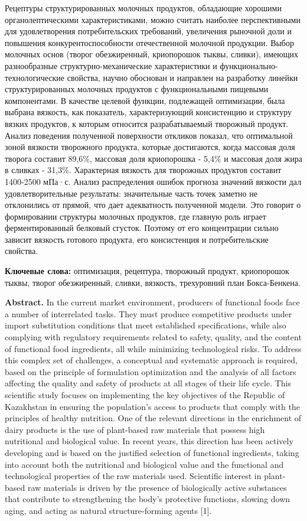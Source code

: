 Рецептуры структурированных молочных продуктов, обладающие хорошими
органолептическими характеристиками, можно считать наиболее
перспективными для удовлетворения потребительских требований, увеличения
рыночной доли и повышения конкурентоспособности отечественной молочной
продукции. Выбор молочных основ (творог обезжиренный, криопорошок тыквы,
сливки), имеющих разнообразные структурно-механические характеристики и
функционально-технологические свойства, научно обоснован и направлен на
разработку линейки структурированных молочных продуктов с
функциональными пищевыми компонентами. В качестве целевой функции,
подлежащей оптимизации, была выбрана вязкость, как показатель,
характеризующий консистенцию и структуру вязких продуктов, к которым
относится разрабатываемый творожный продукт. Анализ поведения полученной
поверхности откликов показал, что оптимальной зоной вязкости творожного
продукта, которые достигаются, когда массовая доля творога составит
89,6\%, массовая доля криопорошка - 5,4\% и массовая доля жира в сливках
- 31,3\%. Характерная вязкость для творожных продуктов составит
1400-2500 мПа·с. Анализ распределения ошибок прогноза значений вязкости
дал удовлетворительные результаты: значительные часть точек заметно не
отклонились от прямой, что дает адекватность полученной модели. Это
говорит о формировании структуры молочных продуктов, где главную роль
играет ферментированный белковый сгусток. Поэтому от его концентрации
сильно зависит вязкость готового продукта, его консистенция и
потребительские свойства.

{\bfseries Ключевые слова:} оптимизация, рецептура, творожный продукт,
криопорошок тыквы, творог обезжиренный, сливки, вязкость, трехуровний
план Бокса-Бенкена.

{\bfseries Abstract.} In the current market environment, producers of
functional foods face a number of interrelated tasks. They must produce
competitive products under import substitution conditions that meet
established specifications, while also complying with regulatory
requirements related to safety, quality, and the content of functional
food ingredients, all while minimizing technological risks. To address
this complex set of challenges, a conceptual and systematic approach is
required, based on the principle of formulation optimization and the
analysis of all factors affecting the quality and safety of products at
all stages of their life cycle. This scientific study focuses on
implementing the key objectives of the Republic of Kazakhstan in
ensuring the population's access to products that comply with the
principles of healthy nutrition. One of the relevant directions in the
enrichment of dairy products is the use of plant-based raw materials
that possess high nutritional and biological value. In recent years,
this direction has been actively developing and is based on the
justified selection of functional ingredients, taking into account both
the nutritional and biological value and the functional and
technological properties of the raw materials used. Scientific interest
in plant-based raw materials is driven by the presence of biologically
active substances that contribute to strengthening the body's protective
functions, slowing down aging, and acting as natural structure-forming
agents {[}1{]}.

